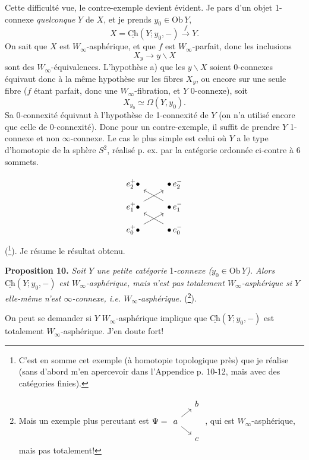 \documentclass[11pt]{article}
\newcommand{\printedpage}[1]{\marginpar{\footnotesize p.~#1}}
\newcommand{\msp}[1]{\marginpar{\footnotesize [#1]}}
\newcommand{\Ob}{\mathrm{Ob}\,}
\newcommand{\uCh}{\underline{\mathrm{Ch}}}
\begin{document}
Cette difficulté vue, le contre-exemple devient évident. Je pars d'un objet 1-connexe \textit{quelconque} $Y$ de $X$, et je prends $y_0 \in \Ob Y$,
\[
X = \uCh(Y; y_0, -) \xrightarrow{\ f\ } Y.
\]
On sait que $X$ est $W_\infty$-asphérique, et que $f$ est $W_\infty$-parfait, donc les inclusions
\[
X_y \longrightarrow y\backslash X
\]
sont des $W_\infty$-équivalences. L'hypothèse a) que les $y\backslash X$ soient 0-connexes équivaut donc à la même hypothèse sur les fibres $X_y$, ou
\msp{page 103}
encore sur une seule fibre ($f$ étant parfait, donc une $W_\infty$-fibration, et $Y$ 0-connexe), soit
\[
X_{y_0} \simeq \Omega(Y, y_0).
\]
Sa 0-connexité équivaut à l'hypothèse de 1-connexité de $Y$ (on n'a utilisé encore que celle de 0-connexité). Donc pour un contre-exemple, il suffit de prendre $Y$ 1-connexe et non $\infty$-connexe. Le cas le plus simple est celui où $Y$ a le type d'homotopie de la sphère $S^2$, réalisé p. ex. par la catégorie ordonnée ci-contre à 6 sommets.

\printedpage{72}
\[
\begin{tikzcd}[row sep=small]
e_2^+ \bullet & \bullet\, e_2^- \\
e_1^+ \bullet \arrow[ur] & \bullet\, e_1^- \arrow[ul] \\
e_0^+ \bullet \arrow[ur] & \bullet\, e_0^- \arrow[ul]
\end{tikzcd}
\]
 (\footnote{C'est en somme cet exemple (à homotopie topologique près) que je réalise (sans d'abord m'en apercevoir dans l'Appendice p. 10-12, mais avec des catégories finies).}). Je résume le résultat obtenu.

\textbf{Proposition 10.} \textit{Soit $Y$ une petite catégorie} 1\textit{-connexe ($y_0 \in \Ob Y$). Alors} $\uCh(Y; y_0, -)$ \textit{est $W_\infty$-asphérique, mais n'est pas totalement $W_\infty$-asphérique si $Y$ elle-même n'est $\infty$-connexe, i.e. $W_\infty$-asphérique.} (\footnote{Mais un exemple plus percutant est $\Psi = \begin{tikzcd}[ampersand replacement=\&, row sep=small, column sep=small, baseline=(A.base)]
 \& b \\
|[alias=A]| a \arrow[ur] \arrow[dr] \& \\
 \& c
\end{tikzcd}$ , qui est $W_\infty$-asphérique, mais pas totalement!}).

On peut se demander si $Y$ $W_\infty$-asphérique implique que $\uCh(Y; y_0, -)$ est totalement $W_\infty$-asphérique. J'en doute fort!
\end{document}
